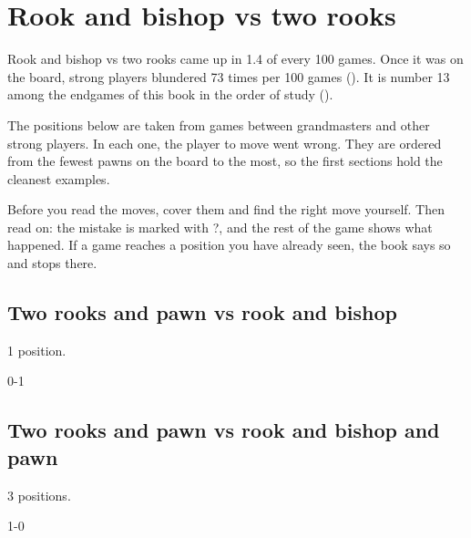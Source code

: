 \chapter{Rook and bishop vs two rooks}\label{ch:rook-and-bishop-vs-two-rooks}
Rook and bishop vs two rooks came up in 1.4 of every 100 games. Once it was on the board, strong players blundered 73 times per 100 games (). It is number 13 among the endgames of this book in the order of study ().

The positions below are taken from games between grandmasters and other strong players. In each one, the player to move went wrong. They are ordered from the fewest pawns on the board to the most, so the first sections hold the cleanest examples.

Before you read the moves, cover them and find the right move yourself. Then read on: the mistake is marked with ?, and the rest of the game shows what happened. If a game reaches a position you have already seen, the book says so and stops there.


\section{Two rooks and pawn vs rook and bishop}
1 position.


0-1\par
\section{Two rooks and pawn vs rook and bishop and pawn}
3 positions.


1-0\par
{}

